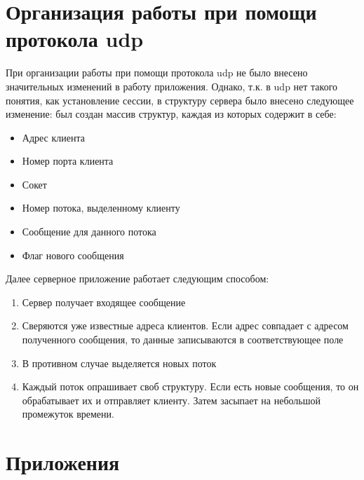 \documentclass[10pt,a4paper]{report}
\begin{document}
\chapter{Организация работы при помощи протокола udp}
При организации работы при помощи протокола udp не было внесено значительных изменений в работу приложения. Однако, т.к. в udp нет такого понятия, как установление сессии, в структуру сервера было внесено следующее изменение: был создан массив структур, каждая из которых содержит в себе:
\begin{itemize}
\item Адрес клиента
\item Номер порта клиента
\item Сокет
\item Номер потока, выделенному клиенту
\item Сообщение для данного потока
\item Флаг нового сообщения
\end{itemize}
Далее серверное приложение работает следующим способом:
\begin{enumerate}
\item Сервер получает входящее сообщение
\item Сверяются уже известные адреса клиентов. Если адрес совпадает с адресом полученного сообщения, то данные записываются в соответствующее поле
\item В противном случае выделяется новых поток
\item Каждый поток опрашивает своб структуру. Если есть новые сообщения, то он обрабатывает их и отправляет клиенту. Затем засыпает на небольшой промежуток времени.
\end{enumerate}
\chapter{Приложения}
\end{document}
